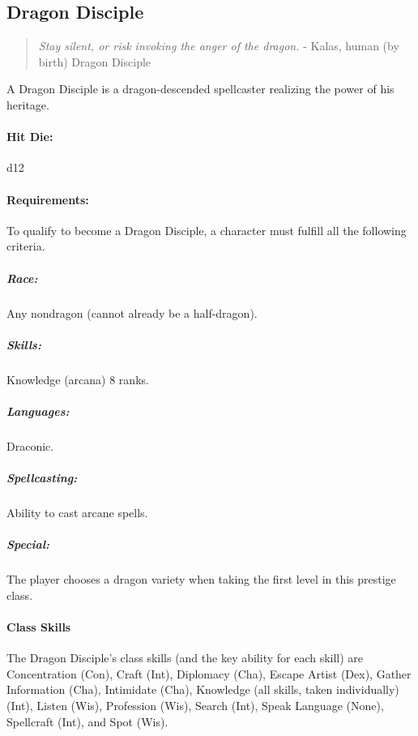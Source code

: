\subsection{Dragon Disciple}
\begin{quote}
\emph{Stay silent, or risk invoking the anger of the dragon.}
- Kalas, human (by birth) Dragon Disciple
\end{quote}
A Dragon Disciple is a dragon-descended spellcaster realizing the power of his heritage.
\paragraph{Hit Die:} d12
\paragraph{Requirements:}
To qualify to become a Dragon Disciple, a character must fulfill all the following criteria.
\subparagraph{Race:} Any nondragon (cannot already be a half-dragon).
\subparagraph{Skills:} Knowledge (arcana) 8 ranks.
\subparagraph{Languages:} Draconic.
\subparagraph{Spellcasting:} Ability to cast arcane spells.
\subparagraph{Special:} The player chooses a dragon variety when taking the first level in this prestige class.
\paragraph{Class Skills}
The Dragon Disciple's class skills (and the key ability for each skill) are Concentration (Con), Craft (Int), Diplomacy (Cha), 
Escape Artist (Dex), Gather Information (Cha), Intimidate (Cha), Knowledge (all skills, taken individually) (Int), 
Listen (Wis), Profession (Wis), Search (Int), Speak Language (None), Spellcraft (Int), and Spot (Wis).
